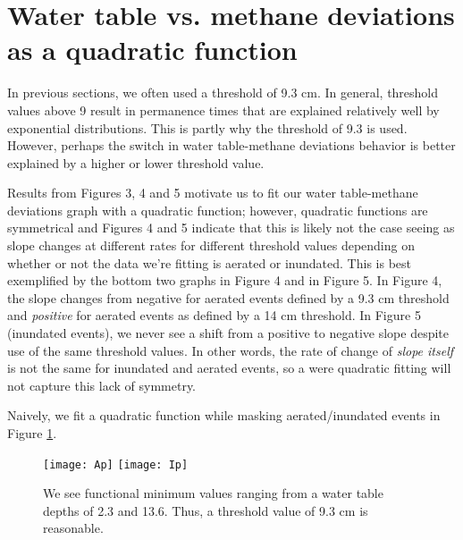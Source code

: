\documentclass[12 pt]{article}
\begin{document}
\section{Water table vs. methane deviations as a quadratic function}
In previous sections, we often used a threshold of 9.3 cm. In general, threshold values above 9 result in permanence times that are explained relatively well by exponential distributions. This is partly why the threshold of 9.3 is used. However, perhaps the switch in water table-methane deviations behavior is better explained by a higher or lower threshold value. 

Results from Figures 3, 4 and 5 motivate us to fit our water table-methane deviations graph with a quadratic function; however, quadratic functions are symmetrical and Figures 4 and 5 indicate that this is likely not the case seeing as slope changes at different rates for different threshold values depending on whether or not the data we're fitting is aerated or inundated. This is best exemplified by the bottom two graphs in Figure 4 and in Figure 5. In Figure 4, the slope changes from negative for aerated events defined by a 9.3 cm threshold and \textit{positive} for aerated events as defined by a 14 cm threshold. In Figure 5 (inundated events), we never see a shift from a positive to negative slope despite use of the same threshold values. In other words, the rate of change of \textit{slope itself} is not the same for inundated and aerated events, so a were quadratic fitting will not capture this lack of symmetry. 

Naively, we fit a quadratic function while masking aerated/inundated events in Figure \ref{quad}. 
\begin{figure}[!htb]
\centering
\texttt{[image: Ap]}
\texttt{[image: Ip]}
\caption{We see functional minimum values ranging from a water table depths of 2.3 and 13.6. Thus, a threshold value of 9.3 cm is reasonable.}\label{quad}
\end{figure}
\end{document}
